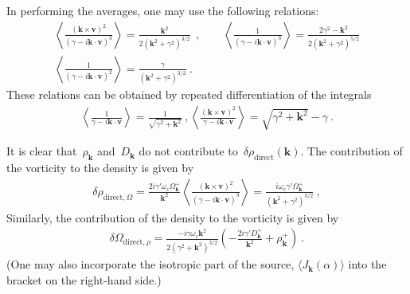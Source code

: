 \documentclass[preprint,aps,eqsecnum]{revtex4-1}
\newcommand{\fplus}[1]{{#1}^{+}}
\begin{document}
In performing the averages, one may use the following relations:
\begin{align}
  \left\langle
  \frac{({\bm k}\times{\bm v})^2}{(\gamma - i {\bm k}\cdot{\bm v})^3}
  \right\rangle =
  \frac{{\bm k}^2}{2\left({\bm k}^2 + \gamma^2\right)^{3/2}}\
  \ , 
  \qquad
  \left\langle                                                                
  \frac{1}{(\gamma - i {\bm k}\cdot{\bm v})^3}    
  \right\rangle = \frac{2\gamma^2 - {\bm k}^2}{
  2 \left({\bm k}^2 + \gamma^2\right)^{5/2}} \\
  \left\langle                                                                
  \frac{1}{(\gamma - i {\bm k}\cdot{\bm v})^2}    
  \right\rangle = \frac{\gamma}{
   \left({\bm k}^2 + \gamma^2\right)^{3/2}} \ . 
\end{align}
These relations can be obtained by repeated differentiation
of the integrals
\begin{align}
  \left\langle \frac{1}{\gamma - i {\bm k}\cdot{\bm v}} \right\rangle
  = \frac{1}{\sqrt{\gamma^2 + {\bm k}^2}}\ ,
  \left\langle \frac{({\bm k}\times{\bm v})^2}{
  \gamma - i {\bm k}\cdot{\bm v}} \right\rangle
  = \sqrt{\gamma^2 + {\bm k}^2} - \gamma \ .  
\end{align}


It is clear that~$\rho_{\bm k}$
and~$D_{\bm k}$ do not contribute to~$ \delta \rho_\mathrm{direct}({\bm k})$.
The contribution of the vorticity to the density is given by
\begin{align}
  \delta \rho_{\mathrm{direct},\Omega}
  = \frac{2i\gamma' \omega_c\fplus{\Omega}_{\bm k}}{{\bm k}^2} \left\langle
  \frac{({\bm k}\times{\bm v})^2}{(\gamma - i {\bm k}\cdot{\bm v})^3}
  \right\rangle
  = \frac{i\omega_c \gamma'\fplus{\Omega}_{\bm k}}{
       \left({\bm k}^2 + \gamma^2\right)^{3/2}} \ , 
\end{align}
Similarly, the contribution of the density to the vorticity is given by
\begin{align}
  \delta\Omega_{\mathrm{direct}, \rho} =
  \frac{-i \gamma \omega_c {\bm k}^2}{2\left(\gamma^2 + {\bm k}^2\right)^{3/2}}
  \left( - \frac{2i\gamma' \fplus{D}_{\bm k}}{{\bm k}^2}
     + \fplus{\rho}_{\bm k}\right)\ . 
\end{align}
(One may also incorporate the isotropic part of the source,
$\langle J_{\bm k}(\alpha) \rangle$ into the bracket on the
right-hand side.)
\end{document}

